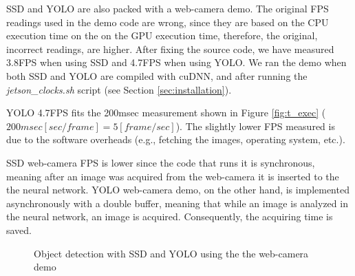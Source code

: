 SSD and YOLO are also packed with a web-camera demo. The original FPS readings used in the demo code are wrong, since they are based on the CPU execution time on the on the GPU execution time, therefore, the original, incorrect readings, are higher. After fixing the source code, we have measured 3.8FPS when using SSD and 4.7FPS when using YOLO. We ran the demo when both SSD and YOLO are compiled with cuDNN, and after running the \textit{jetson\_clocks.sh} script (see Section \ref{sec:installation}).

YOLO 4.7FPS fits the 200msec measurement shown in Figure \ref{fig:t_exec} ($200msec [sec/frame] = 5[frame/sec]$). The slightly lower FPS measured is due to the software overheads (e.g., fetching the images, operating system, etc.).

SSD web-camera FPS is lower since the code that runs it is synchronous, meaning after an image was acquired from the web-camera it is inserted to the the neural network. YOLO web-camera demo, on the other hand, is implemented asynchronously with a double buffer, meaning that while an image is analyzed in the neural network, an image is acquired. Consequently, the acquiring time is saved. 

\begin{figure}[h]
	\caption{Object detection with SSD and YOLO using the the web-camera demo}
	\label{fig:cam}
\end{figure}